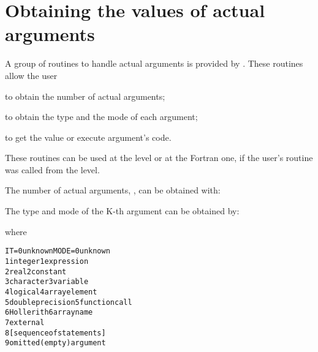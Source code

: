 
\chapter{Obtaining the values of actual arguments}
\label{sec:obtain-values-for-actual-paramers}
 
A group of routines to handle actual arguments is provided
by \COMIS{}.
These routines allow the user
\begin{UL}
\item to obtain the number of actual arguments;
\item to obtain the type and the mode of each argument;
\item to get the value or execute argument's code.
\end{UL}
These routines can be
used at the \COMIS{} level or at the Fortran one, if the user's
routine was called from the \COMIS{} level.

The number of actual arguments, , can be obtained with:


The type and mode of the K-th argument can be obtained by:


where
\begin{alltt}
  IT=0    unknown              MODE=0   unknown
     1    integer                   1   expression
     2    real                      2   constant
     3    character                 3   variable
     4    logical                   4   array element
     5    double precision          5   function call
     6    Hollerith                 6   array name
                                    7   external
                                    8   [sequence of statements]
                                    9   omitted (empty) argument
\end{alltt}

